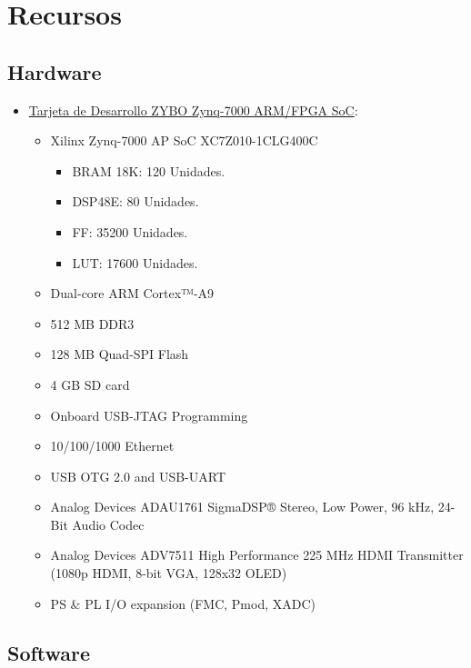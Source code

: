 \chapter{Recursos} %
\label{Chapter7}

\section{Hardware}

\begin{itemize}
\item \href{https://store.digilentinc.com/zybo-zynq-7000-arm-fpga-soc-trainer-board/}{Tarjeta de Desarrollo ZYBO Zynq-7000 ARM/FPGA SoC}:
  \begin{itemize}
  \item Xilinx Zynq-7000 AP SoC XC7Z010-1CLG400C
    \begin{itemize}
    \item BRAM 18K: 120 Unidades.
    \item DSP48E: 80 Unidades.
    \item FF: 35200 Unidades.
    \item LUT: 17600 Unidades.
    \end{itemize}
  \item Dual-core ARM Cortex™-A9 
  \item 512 MB DDR3 
  \item 128 MB Quad-SPI Flash 
  \item 4 GB SD card 
  \item Onboard USB-JTAG Programming
  \item 10/100/1000 Ethernet 
  \item USB OTG 2.0 and USB-UART 
  \item Analog Devices ADAU1761 SigmaDSP® Stereo, Low Power, 96 kHz, 24-Bit Audio Codec
  \item Analog Devices ADV7511 High Performance 225 MHz HDMI Transmitter (1080p HDMI, 8-bit VGA, 128x32 OLED)
  \item PS \& PL I/O expansion (FMC, Pmod, XADC) 
  \end{itemize}
\end{itemize}

\section{Software}

